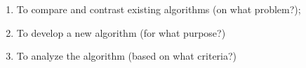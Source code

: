 \begin{comment}
How to formulate your research objectives:
1. Identify what research steps do you need to perform to achieve your general objective.
2. Identify the questions that must be answered for you to achieve your general objective.
    Thereafter, convert these questions into action statements

Example #1:

Research Question:
  What are the general features of a web-based learning environment?

Specific Objective:
   To review existing web-based learning environment that teaches language learning for children


Example #2:

Research Question:
   How will you represent commonsense knowledge for use by computer systems?

Specific Objective:
   To identify knowledge representation approaches used by existing story generation systems

Example #3:
Research Question:
   What types of storytelling knowledge are needed to generate stories?

Specific Objective:
    To identify the different types of storytelling knowledge used in generating stories

Example #4:
Research Question:
    What machine learning approaches will you utilize?

Specific Objective:
    To determine existing machine learning algorithms [that can be used in training the computer system to detect cyberbullying cases] 

Example #5: Research Question:
    How will your research output be evaluated?

Specific Objective:
    To define evaluation metrics for validating the accuracy of the translation

\end{comment}

%
%

\begin{enumerate}
   \item To compare and contrast existing algorithms (on what problem?);
   \item To develop a new algorithm (for what purpose?)
   \item To analyze the algorithm (based on what criteria?)
\end{enumerate}


